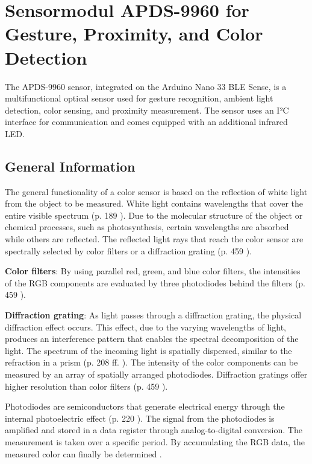 %
%
%

\chapter{Sensormodul APDS-9960 for Gesture, Proximity, and Color Detection}

The APDS-9960 sensor, integrated on the Arduino Nano 33 BLE Sense, is a multifunctional optical sensor used for gesture recognition, ambient light detection, color sensing, and proximity measurement. The sensor uses an I²C interface for communication and comes equipped with an additional infrared LED.
\cite{Avago:2015}

\section{General Information}

The general functionality of a color sensor is based on the reflection of white light from the object to be measured. White light contains wavelengths that cover the entire visible spectrum (p. 189 \cite{Rybach:2013}). Due to the molecular structure of the object or chemical processes, such as photosynthesis, certain wavelengths are absorbed while others are reflected. The reflected light rays that reach the color sensor are spectrally selected by color filters or a diffraction grating (p. 459 \cite{Hering:2018}). 

\textbf{Color filters}: By using parallel red, green, and blue color filters, the intensities of the RGB components are evaluated by three photodiodes behind the filters (p. 459 \cite{Hering:2018}).

\textbf{Diffraction grating}: As light passes through a diffraction grating, the physical diffraction effect occurs. This effect, due to the varying wavelengths of light, produces an interference pattern that enables the spectral decomposition of the light. The spectrum of the incoming light is spatially dispersed, similar to the refraction in a prism (p. 208 ff. \cite{Rybach:2013}). The intensity of the color components can be measured by an array of spatially arranged photodiodes. Diffraction gratings offer higher resolution than color filters (p. 459 \cite{Hering:2018}).

Photodiodes are semiconductors that generate electrical energy through the internal photoelectric effect (p. 220 \cite{Rybach:2013}). The signal from the photodiodes is amplified and stored in a data register through analog-to-digital conversion. The measurement is taken over a specific period. By accumulating the RGB data, the measured color can finally be determined \cite{Avago:2015}. 

